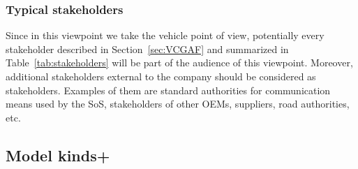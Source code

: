 \subsubsection{Typical stakeholders} 

Since in this viewpoint we take the vehicle point of view, potentially every stakeholder described in Section~\ref{sec:VCGAF} and summarized in Table~\ref{tab:stakeholders} will be part of the audience of this viewpoint. Moreover, additional stakeholders external to the company should be considered as stakeholders. Examples of them are standard authorities for communication means used by the SoS, stakeholders of other OEMs, suppliers, road authorities, etc.

%
%

%
%
%



\subsection{Model kinds+}\label{mk:list}

